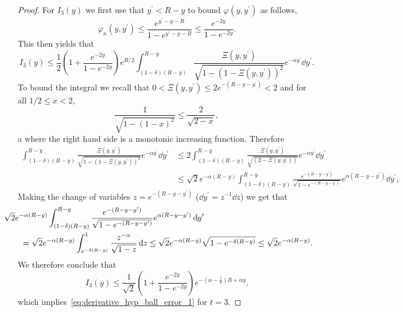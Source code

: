 \begin{appendices}
\begin{proof}
For $I_3(y)$ we first use that $y^\prime < R - y$ to bound $\varphi(y,y^\prime)$ as follows,
\[
	\varphi_n(y,y^\prime) \le \frac{e^{y^\prime - y - R}}{1 - e^{y^\prime - y - R}} \le \frac{e^{-2y}}{1 - e^{-2y}}.
\]
This then yields that
\[
	I_3(y) \le \frac{1}{2}\left(1 + \frac{e^{-2y}}{1 - e^{-2y}}\right)e^{R/2}
	\int_{(1-\delta)(R- y)}^{R - y} \frac{ \Xi(y,y^\prime)}{\sqrt{1 - \left(1 - \Xi(y,y^\prime)\right)^2}}
	e^{-\alpha y^\prime} \dd y^\prime.
\]
To bound the integral we recall that $0 < \Xi(y,y^\prime) \le 2e^{-(R-y-y^\prime)} < 2$ and for all $1/2 \le x < 2$,
\[
	\frac{1}{\sqrt{1- (1-x)^2}} \le \frac{2}{\sqrt{2-x}},
\]a
where the right hand side is a monotonic increasing function.
Therefore
\begin{align*}
	\int_{(1-\delta)(R- y)}^{R - y} \frac{ \Xi(y,y^\prime)}{\sqrt{1 - \left(1 - \Xi(y,y^\prime)\right)^2}}
		e^{-\alpha y^\prime} \dd y^\prime
	&\le 2 \int_{(1-\delta)(R- y)}^{R - y} \frac{\Xi(y,y^\prime)}{\sqrt{(2-\Xi(y,y^\prime))}} e^{-\alpha y^\prime} 
		\dd y^\prime \\
	&\le \sqrt{2} e^{-\alpha(R - y)} \int_{(1-\delta)(R- y)}^{R - y} 
		\frac{e^{-(R - y - y^\prime)}}{\sqrt{1 - e^{-(R - y - y^\prime)}}} e^{\alpha (R - y - y^\prime)} \dd y^\prime,
\end{align*}
Making the change of variables $z = e^{-(R - y - y^\prime)}$ ($\dd y^\prime = z^{-1} \dd z$) we get that
\begin{align*}
	&\hspace{-20pt}\sqrt{2} e^{-\alpha(R - y)} \int_{(1-\delta)(R- y)}^{R - y} 
			\frac{e^{-(R - y - y^\prime)}}{\sqrt{1 - e^{-(R - y - y^\prime)}}} e^{\alpha (R - y - y^\prime)} \dd y^\prime\\
	&= \sqrt{2} e^{-\alpha(R - y)} \int_{e^{-\delta (R - y)}}^{1} \frac{z^{-\alpha}}{\sqrt{1 - z}} \dd z
		\le \sqrt{2} e^{-\alpha(R - y)} \sqrt{1 - e^{-\delta (R - y)}}
		\le \sqrt{2} e^{-\alpha (R -y)}.
\end{align*}
We therefore conclude that
\[
	I_3(y) \le \frac{1}{\sqrt{2}} \left(1 + \frac{e^{-2y}}{1 - e^{-2y}}\right)e^{-(\alpha -\frac{1}{2})R + \alpha y}.
\]
which implies~\eqref{eq:derivative_hyp_ball_error_1} for $t=3$.


\end{proof}
\end{appendices}
